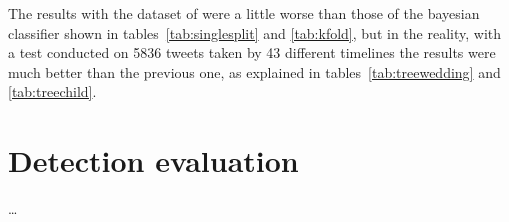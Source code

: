 The results with the dataset of \cite{dickinson2015identifying} were a little worse than those of the bayesian classifier shown in tables~\ref{tab:singlesplit} and \ref{tab:kfold}, but in the reality, with a test conducted on 5836 tweets taken by 43 different timelines the results were much better than the previous one, as explained in tables~\ref{tab:treewedding} and \ref{tab:treechild}.

\begin{table}[htbp]
\centering
{}\qquad\qquad
{}
\caption{The performance of the decision tree with a very unbalanced dataset. On this same test set the previous classifier, the naive bayes, showed both precision and recall scores under 0.1.}
\end{table}

\section{Detection evaluation}
\label{sec:detectioneva}
\dots